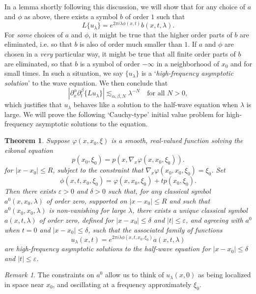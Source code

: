 \documentclass{article}
\theoremstyle{plain}
\newtheorem{theorem}{Theorem}
\theoremstyle{remark}
\newtheorem*{remark}{Remark}
\theoremstyle{definition}
\begin{document}
In a lemma shortly following this discussion, we will show that for any choice of $a$ and $\phi$ as above, there exists a symbol $b$ of order $1$ such that
%
\[ L \{ u_\lambda \} = e^{2 \pi i \lambda \phi(x,t)} b(x,t,\lambda). \]
%
For \emph{some} choices of $a$ and $\phi$, it might be true that the higher order parts of $b$ are eliminated, i.e. so that $b$ is also of order much smaller than $1$. If $a$ and $\phi$ are chosen in a \emph{very} particular way, it might be true that all finite order parts of $b$ are eliminated, so that $b$ is a symbol of order $-\infty$ in a neighborhood of $x_0$ and for small times. In such a situation, we say $\{ u_\lambda \}$ is a `\emph{high-frequency asymptotic solution}' to the wave equation. We then conclude that
%
\[ |\partial_x^\alpha \partial_t^\beta \{ L u_\lambda \}| \lesssim_{\alpha,\beta,N} \lambda^{-N} \quad\text{for all $N > 0$}, \]
which justifies that $u_\lambda$ behaves like a solution to the half-wave equation when $\lambda$ is large. We will prove the following `Cauchy-type' initial value problem for high-frequency asymptotic solutions to the equation.

\begin{theorem}
	Suppose $\varphi(x,x_0,\xi)$ is a smooth, real-valued function solving the \emph{eikonal equation}
	\[ p(x_0,\xi_0) = p(x, \nabla_x \varphi(x,x_0,\xi_0)). \]
	for $|x - x_0| \leq R$, subject to the constraint that $\nabla_x \varphi(x_0,x_0,\xi_0) = \xi_0$. Set
	\[ \phi(x,t,x_0,\xi_0) = \varphi(x,x_0,\xi_0) + t p(x_0,\xi_0). \]
	Then there exists $\varepsilon > 0$ and $\delta > 0$ such that, for any classical symbol $a^0(x,x_0,\lambda)$ of order zero, supported on $|x - x_0| \leq R$ and such that $a^0(x_0,x_0,\lambda)$ is non-vanishing for large $\lambda$, there exists a unique classical symbol $a(x,t,\lambda)$ of order zero, defined for $|x - x_0| \leq \delta$ and $|t| \leq \varepsilon$, and agreeing with $a^0$ when $t = 0$ and $|x - x_0| \leq \delta$, such that the associated family of functions
	\[ u_\lambda(x,t) = e^{2 \pi i \lambda \phi(x,t,x_0,\xi_0)} a(x,t,\lambda) \]
	are high-frequency asymptotic solutions to the half-wave equation for $|x - x_0| \leq \delta$ and $|t| \leq \varepsilon$.
\end{theorem}

\begin{remark}
	The constraints on $a^0$ allow us to think of $u_\lambda(x,0)$ as being localized in space near $x_0$, and oscillating at a frequency approximately $\xi_0$.
\end{remark}
\end{document}
